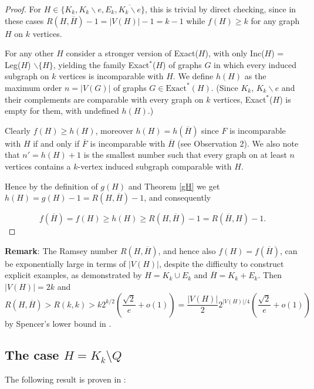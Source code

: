 \documentclass[a4paper,12pt]{article}
\begin{document}
\begin{proof}
For $H \in \{  K_k, K_k\backslash e, E_k, \overline{K_k\backslash e}\}$, this is trivial by direct checking,  since in these cases $R(H,\overline{H}) - 1=|V(H)|-1= k-1$ while $f(H)\geq k$ for any graph $H$ on $k$ vertices.

For any other $H$ consider a stronger version of Exact($H$), with only Inc($H$) =  Leg($H$) $\backslash  \{H\}$, yielding the family Exact$^*$($H$) of graphs $G$ in which every induced subgraph on $k$ vertices is incomparable with  $H$.
We define $h(H)$ as the maximum order $n=|V(G)|$ of graphs $G \in \text{Exact}^*(H)$.
(Since $K_k$, $K_k\backslash e$ and their complements are comparable with every graph on $k$ vertices,  Exact$^*$($H$) is empty for them, with undefined $h(H)$.)


Clearly $f(H) \geq h(H)$, moreover $h(H) = h(\overline{H})$ since $F$ is incomparable with $H$ if and only if $\overline{F}$ is incomparable with $\overline{H}$ (see Observation 2).  We also note that $n' = h(H)+1$ is the smallest number such that every graph on at least $n$ vertices contains a $k$-vertex induced subgraph comparable with $H$.

Hence by the definition of $g(H)$ and Theorem \ref{gH} we get $h(H) = g(H) - 1 = R(H,\overline{H}) -1$, and consequently

 \[f(\overline{H}) =f(H) \geq h(H) \geq R(H,\overline{H})  - 1  = R(\overline{H},H) - 1.\]
\end{proof}

\noindent \textbf{Remark}: The Ramsey number $R(H,\overline{H})$, and hence also $f(H)=f(\overline{H})$, can be exponentially large in terms of $|V (H)|$, despite the difficulty to construct explicit examples, as demonstrated by $H =  K_k  \cup E_k$  and $\overline{H} = K_k + E_k$.  Then $|V(H)| = 2k$ and  \[R(H,\overline{H}) > R(k,k) > k2^{k/2} \left(\frac{\sqrt{2}}{e} +o(1) \right)  = \frac{|V(H)|}{2}2^{|V(H)|/4} \left(\frac{\sqrt{2}}{e} +o(1) \right)\]
by Spencer's lower bound in \cite{SPENCER1975108}.



\subsection{The case $H=K_k \setminus Q$}
The following result is proven in \cite{Caro1994}:
\end{document}
